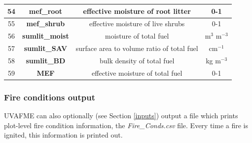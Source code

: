 \documentclass[a4paper, 12pt] {article}
\begin{document}
\begin{table} [H]
{\begin{tabular}{|c|c|c|c|}
			\hline 
			54 & \textbf{mef\_root} & effective moisture of root litter & 0-1   \\
			\hline 
			55 & \textbf{mef\_shrub} & effective moisture of live shrubs & 0-1   \\
			\hline 
			56 & \textbf{sumlit\_moist} & moisture of total fuel & m$^3$ m$^{-3}$   \\
			\hline 
			57 & \textbf{sumlit\_SAV} & surface area to volume ratio of total fuel & cm$^{-1}$   \\
			\hline 
			58 & \textbf{sumlit\_BD} & bulk density of total fuel & kg m$^{-3}$   \\
			\hline 
			59 & \textbf{MEF} & effective moisture of total fuel &  0-1  \\
			\hline 
	\end{tabular}}
\end{table}

\subsubsection{Fire conditions output}

UVAFME can also optionally (see Section \ref{inputs}) output a file which prints plot-level fire condition information, the \textit{Fire\_Conds.csv} file. Every time a fire is ignited, this information is printed out.
\end{document}
